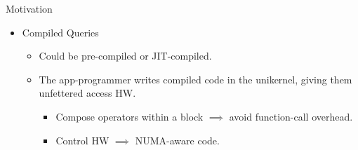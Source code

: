 \begin{block}{Motivation}
\begin{itemize}
  \item Compiled Queries
    \begin{itemize}
    \item Could be pre-compiled or JIT-compiled.
    \item {The app-programmer writes compiled code in the unikernel, giving them unfettered access HW.}
      \begin{itemize}
      \item Compose operators within a block $\implies$ avoid function-call overhead.
      \item Control HW $\implies$ NUMA-aware code.
      \end{itemize}
    \end{itemize}

  \end{itemize}

\end{block}

